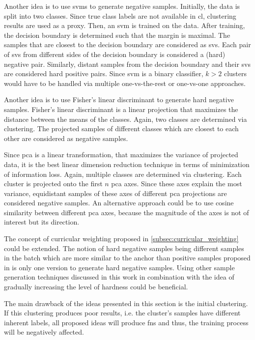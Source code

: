 Another idea is to use \acp{svm} to generate negative samples.
Initially, the data is split into two classes. 
Since true class labels are not available in \ac{cl}, clustering results are used as a proxy.
Then, an \ac{svm} is trained on the data.
After training, the decision boundary is determined such that the margin is maximal.
The samples that are closest to the decision boundary are considered as \acp{sv}.
Each pair of \acp{sv} from different sides of the decision boundary is considered a (hard) negative pair.
Similarly, distant samples from the decision boundary and their \acp{sv} are considered hard positive pairs.
Since \ac{svm} is a binary classifier, $k>2$ clusters would have to be handled via
multiple one-vs-the-rest or one-vs-one approaches.

Another idea is to use Fisher's linear discriminant to generate hard negative samples.
Fisher's linear discriminant is a linear projection that maximizes the distance between the means of the classes.
Again, two classes are determined via clustering.
The projected samples of different classes which are closest to each other are considered as negative samples.

Since \ac{pca} is a linear transformation, that maximizes the variance of projected data, 
it is the best linear dimension reduction technique in terms of minimization of information loss.
Again, multiple classes are determined via clustering.
Each cluster is projected onto the first $n$ \ac{pca} axes.
Since these axes explain the most variance, equidistant samples of these axes of different \ac{pca} projections 
are considered negative samples.
An alternative approach could be to use cosine similarity between different \ac{pca} axes, 
because the magnitude of the axes is not of interest but its direction.

The concept of curricular weighting proposed in \autoref{subsec:curricular_weighting} could be extended.
The notion of hard negative samples being different samples in the batch which are more similar to the anchor than positive samples 
proposed in \citet{curricular_weighting_2024} is only one version to generate hard negative samples.
Using other sample generation techniques discussed in this work in combination with 
the idea of gradually increasing the level of hardness could be beneficial.

The main drawback of the ideas presented in this section is the initial clustering.
If this clustering produces poor results, i.e. the cluster's samples have different inherent labels, 
all proposed ideas will produce \acp{fn} and thus, the training process will be negatively affected.